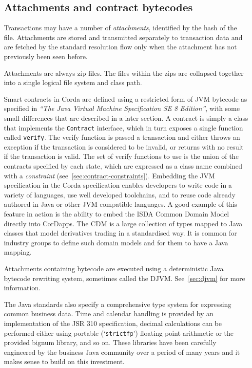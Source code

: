 \documentclass{article}
\begin{document}
\subsection{Attachments and contract bytecodes}\label{subsec:attachments-and-contract-bytecodes}

Transactions may have a number of \emph{attachments}, identified by the hash of the file. Attachments are stored
and transmitted separately to transaction data and are fetched by the standard resolution flow only when the
attachment has not previously been seen before.

Attachments are always zip files\cite{ZipFormat}. The files within the zips are collapsed together into a single
logical file system and class path.

Smart contracts in Corda are defined using a restricted form of JVM bytecode as specified in \emph{``The Java
Virtual Machine Specification SE 8 Edition''}\cite{JVM}, with some small differences that are described in a later
section. A contract is simply a class that implements the \texttt{Contract} interface, which in turn exposes a
single function called \texttt{verify}. The verify function is passed a transaction and either throws an exception
if the transaction is considered to be invalid, or returns with no result if the transaction is valid. The set of
verify functions to use is the union of the contracts specified by each state, which are expressed as a class name
combined with a \emph{constraint} (see~\cref{sec:contract-constraints}). Embedding the JVM specification in the
Corda specification enables developers to write code in a variety of languages, use well developed toolchains, and
to reuse code already authored in Java or other JVM compatible languages. A good example of this feature in action
is the ability to embed the ISDA Common Domain Model\cite{ISDACDM} directly into CorDapps. The CDM is
a large collection of types mapped to Java classes that model derivatives trading in a standardised way. It is
common for industry groups to define such domain models and for them to have a Java mapping.

Attachments containing bytecode are executed using a deterministic Java bytecode rewriting system, sometimes called
the DJVM. See~\cref{sec:djvm} for more information.

The Java standards also specify a comprehensive type system for expressing common business data. Time and calendar
handling is provided by an implementation of the JSR 310 specification, decimal calculations can be performed
either using portable (`\texttt{strictfp}') floating point arithmetic or the provided bignum library, and so on.
These libraries have been carefully engineered by the business Java community over a period of many years and it
makes sense to build on this investment.
\end{document}
